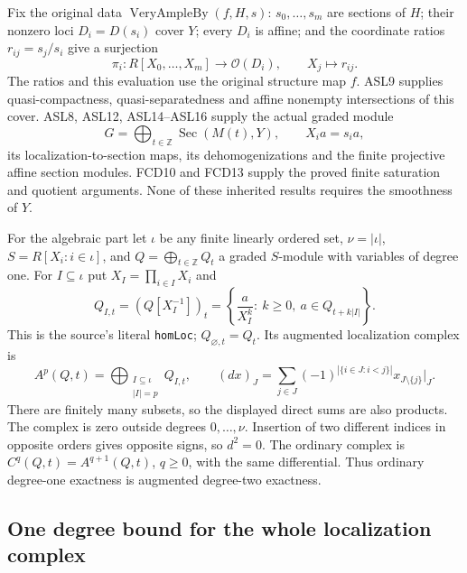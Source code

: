 Fix the original data $\operatorname{VeryAmpleBy}(f,H,s)$:
$s_0,\ldots,s_m$ are sections of $H$; their nonzero loci
$D_i=D(s_i)$ cover $Y$; every $D_i$ is affine; and the coordinate
ratios $r_{ij}=s_j/s_i$ give a surjection
\[
 \pi_i:R[X_0,\ldots,X_m]\longrightarrow\mathcal O(D_i),
 \qquad X_j\longmapsto r_{ij}.
                                                        \tag{SHV.1}
\]
The ratios and this evaluation use the original structure map $f$.
ASL9 supplies quasi-compactness, quasi-separatedness and affine nonempty
intersections of this cover.  ASL8, ASL12, ASL14--ASL16 supply the actual
graded module
\[
 G=\bigoplus_{t\in\mathbb Z}\operatorname{Sec}(M(t),Y),
 \qquad X_i a=s_i a,
                                                        \tag{SHV.2}
\]
its localization-to-section maps, its dehomogenizations and the finite
projective affine section modules.  FCD10 and FCD13 supply the proved
finite saturation and quotient arguments.  None of these inherited
results requires the smoothness of $Y$.

For the algebraic part let $\iota$ be any finite linearly ordered set,
$\nu=|\iota|$, $S=R[X_i:i\in\iota]$, and
$Q=\bigoplus_{t\in\mathbb Z}Q_t$ a graded $S$-module with variables
of degree one.  For $I\subseteq\iota$ put $X_I=\prod_{i\in I}X_i$
and
\[
 Q_{I,t}=(Q[X_I^{-1}])_t
 =\left\{\frac{a}{X_I^k}:\
       k\ge0,\ a\in Q_{t+k|I|}\right\}.
                                                        \tag{SHV.3}
\]
This is the source's literal \texttt{homLoc}; $Q_{\varnothing,t}=Q_t$.
Its augmented localization complex is
\[
 A^p(Q,t)=\bigoplus_{\substack{I\subseteq\iota\\|I|=p}}Q_{I,t},
 \qquad
 (d x)_J=\sum_{j\in J}(-1)^{|\{i\in J:i<j\}|}
                   x_{J\setminus\{j\}}\big|_J .
                                                        \tag{SHV.4}
\]
There are finitely many subsets, so the displayed direct sums are also
products.  The complex is zero outside degrees $0,\ldots,\nu$.
Insertion of two different indices in opposite orders gives opposite
signs, so $d^2=0$.  The ordinary complex is
$C^q(Q,t)=A^{q+1}(Q,t)$, $q\ge0$, with the same differential.
Thus ordinary degree-one exactness is augmented degree-two exactness.

\subsection{One degree bound for the whole localization complex}

